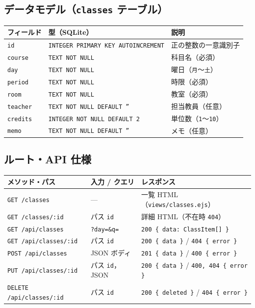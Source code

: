 \documentclass[
  a4paper,
  fontsize=11pt,
  line_length=40zw,
  number_of_lines=35,
  baselineskip=1.7zw
]{jlreq}
\begin{document}
\subsection{データモデル（\texttt{classes} テーブル）}
\begin{table}[htbp]
  \centering
  \small
  \begin{tabularx}{\textwidth}{llX}
    \toprule
    フィールド & 型（SQLite） & 説明 \\
    \midrule
    \texttt{id} & \texttt{INTEGER PRIMARY KEY AUTOINCREMENT} & 正の整数の一意識別子 \\
    \texttt{course} & \texttt{TEXT NOT NULL} & 科目名（必須） \\
    \texttt{day} & \texttt{TEXT NOT NULL} & 曜日（\texttt{月}〜\texttt{土}） \\
    \texttt{period} & \texttt{TEXT NOT NULL} & 時限（必須） \\
    \texttt{room} & \texttt{TEXT NOT NULL} & 教室（必須） \\
    \texttt{teacher} & \texttt{TEXT NOT NULL DEFAULT ''} & 担当教員（任意） \\
    \texttt{credits} & \texttt{INTEGER NOT NULL DEFAULT 2} & 単位数（\texttt{1}〜\texttt{10}） \\
    \texttt{memo} & \texttt{TEXT NOT NULL DEFAULT ''} & メモ（任意） \\
    \bottomrule
  \end{tabularx}
\end{table}

\subsection{ルート・API 仕様}
\begin{table}[htbp]
  \centering
  \small
  \begin{tabularx}{\textwidth}{llX}
    \toprule
    メソッド・パス & 入力 / クエリ & レスポンス \\
    \midrule
    \texttt{GET /classes} & — & 一覧 HTML（\texttt{views/classes.ejs}） \\
    \texttt{GET /classes/:id} & パス \texttt{id} & 詳細 HTML（不在時 \texttt{404}） \\
    \texttt{GET /api/classes} & \texttt{?day=\&q=} & \texttt{200 \{ data: ClassItem[] \}} \\
    \texttt{GET /api/classes/:id} & パス \texttt{id} & \texttt{200 \{ data \}} / \texttt{404 \{ error \}} \\
    \texttt{POST /api/classes} & JSON ボディ & \texttt{201 \{ data \}} / \texttt{400 \{ error \}} \\
    \texttt{PUT /api/classes/:id} & パス \texttt{id}，JSON & \texttt{200 \{ data \}} / \texttt{400, 404 \{ error \}} \\
    \texttt{DELETE /api/classes/:id} & パス \texttt{id} & \texttt{200 \{ deleted \}} / \texttt{404 \{ error \}} \\
    \bottomrule
  \end{tabularx}
\end{table}
\end{document}
